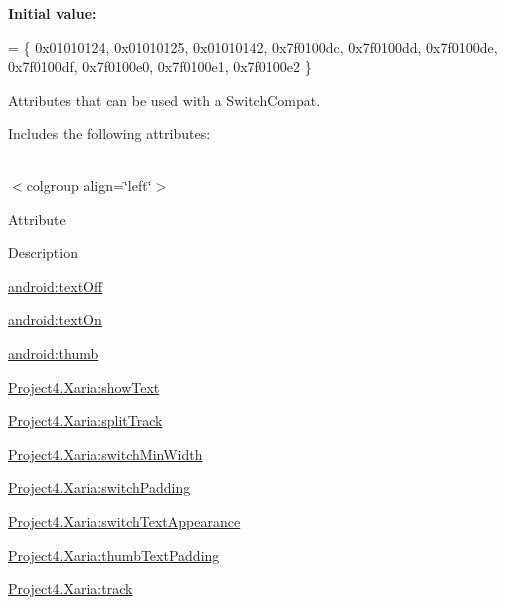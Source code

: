 {\bfseries Initial value\+:}
\begin{DoxyCode}
= \{
            0x01010124, 0x01010125, 0x01010142, 0x7f0100dc,
            0x7f0100dd, 0x7f0100de, 0x7f0100df, 0x7f0100e0,
            0x7f0100e1, 0x7f0100e2
        \}
\end{DoxyCode}
Attributes that can be used with a Switch\+Compat. 

Includes the following attributes\+:

\tabulinesep=1mm
\begin{longtabu} spread 0pt [c]{*{0}{|X[-1]}|}
\hline
\end{longtabu}
$<$colgroup align=\char`\"{}left\char`\"{}$>$ 

Attribute

Description 

{\ttfamily \hyperlink{classproject4_1_1xaria_1_1R_1_1styleable_a3f671633e0728718307fc21b5d2413c3}{android\+:text\+Off}}

{\ttfamily \hyperlink{classproject4_1_1xaria_1_1R_1_1styleable_addeae4c36c168e8d419f957fd6c97234}{android\+:text\+On}}

{\ttfamily \hyperlink{classproject4_1_1xaria_1_1R_1_1styleable_a022bff7fbd81db1814b1440617e056c3}{android\+:thumb}}

{\ttfamily \hyperlink{classproject4_1_1xaria_1_1R_1_1styleable_a14c2b4b128399b1f12166f13c16525d4}{Project4.\+Xaria\+:show\+Text}}

{\ttfamily \hyperlink{classproject4_1_1xaria_1_1R_1_1styleable_a9e4d678c79e9aa05ed9604fba7663099}{Project4.\+Xaria\+:split\+Track}}

{\ttfamily \hyperlink{classproject4_1_1xaria_1_1R_1_1styleable_aecb92273fe1bfad399b3793d1061e0b7}{Project4.\+Xaria\+:switch\+Min\+Width}}

{\ttfamily \hyperlink{classproject4_1_1xaria_1_1R_1_1styleable_a42e6a70d6b1f16cdf82c30ba3a3ac3bd}{Project4.\+Xaria\+:switch\+Padding}}

{\ttfamily \hyperlink{classproject4_1_1xaria_1_1R_1_1styleable_a8e811c82f279d1bba5afc81c9708b5a6}{Project4.\+Xaria\+:switch\+Text\+Appearance}}

{\ttfamily \hyperlink{classproject4_1_1xaria_1_1R_1_1styleable_ad2019cfb3db37eb7854eb363ab28b13c}{Project4.\+Xaria\+:thumb\+Text\+Padding}}

{\ttfamily \hyperlink{classproject4_1_1xaria_1_1R_1_1styleable_af96cd765a1838db8e0772f079ce6fa52}{Project4.\+Xaria\+:track}}

